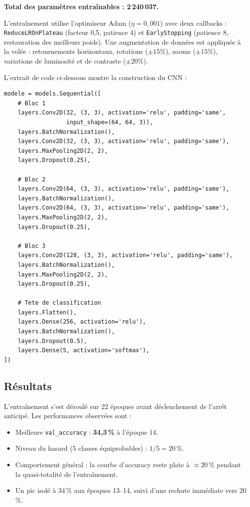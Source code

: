 \documentclass[12pt, a4paper]{article}
\newcommand{\code}[1]{\texttt{\small #1}}
\begin{document}
\textbf{Total des paramètres entraînables : 2\,240\,037.}

L'entraînement utilise l'optimiseur Adam (\(\eta = 0{,}001\)) avec deux callbacks :
\code{ReduceLROnPlateau} (facteur 0,5, patience 4) et
\code{EarlyStopping} (patience 8, restauration des meilleurs poids).
Une augmentation de données est appliquée à la volée :
retournements horizontaux, rotations (\(\pm 15\%\)),
zooms (\(\pm 15\%\)), variations de luminosité et de contraste (\(\pm 20\%\)).

L'extrait de code ci-dessous montre la construction du CNN :

\begin{lstlisting}[caption={Architecture CNN (extrait de \texttt{2\_entrainer\_cnn.py})},
                   label=lst:cnn_arch]
modele = models.Sequential([
    # Bloc 1
    layers.Conv2D(32, (3, 3), activation='relu', padding='same',
                  input_shape=(64, 64, 3)),
    layers.BatchNormalization(),
    layers.Conv2D(32, (3, 3), activation='relu', padding='same'),
    layers.MaxPooling2D(2, 2),
    layers.Dropout(0.25),

    # Bloc 2
    layers.Conv2D(64, (3, 3), activation='relu', padding='same'),
    layers.BatchNormalization(),
    layers.Conv2D(64, (3, 3), activation='relu', padding='same'),
    layers.MaxPooling2D(2, 2),
    layers.Dropout(0.25),

    # Bloc 3
    layers.Conv2D(128, (3, 3), activation='relu', padding='same'),
    layers.BatchNormalization(),
    layers.MaxPooling2D(2, 2),
    layers.Dropout(0.25),

    # Tete de classification
    layers.Flatten(),
    layers.Dense(256, activation='relu'),
    layers.BatchNormalization(),
    layers.Dropout(0.5),
    layers.Dense(5, activation='softmax'),
])
\end{lstlisting}

\subsection{Résultats}

L'entraînement s'est déroulé sur 22 époques avant déclenchement de
l'arrêt anticipé. Les performances observées sont :

\begin{itemize}
  \item Meilleure \code{val\_accuracy} : \textbf{34,3\,\%} à l'époque 14.
  \item Niveau du hasard (5 classes équiprobables) : \(1/5 = 20\,\%\).
  \item Comportement général : la courbe d'accuracy reste plate à \(\approx 20\,\%\)
        pendant la quasi-totalité de l'entraînement.
  \item Un pic isolé à 34\,\% aux époques 13--14, suivi d'une rechute immédiate
        vers 20\,\%.
\end{itemize}
\end{document}
